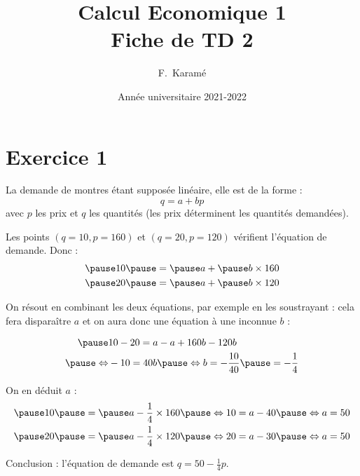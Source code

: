 \documentclass[9pt,professionalfonts,handout,hyperref]{beamer}
\title{Calcul Economique 1\\Fiche de TD 2}
\author{F.~Karamé}
\date{Année universitaire 2021-2022}
\begin{document}
\begin{frame}
  \titlepage
\end{frame}

\section{Exercice 1}

%
%

\begin{frame}

    La demande de montres étant supposée linéaire, elle est de la forme : $$q = a + bp $$ avec $p$ les prix et $q$ les quantités (les prix déterminent les quantités demandées).\newline

    \pause Les points $(q=10,p=160)$ et $(q=20,p=120)$ vérifient l'équation de demande. \pause Donc :
    \[
      \begin{aligned}
        \pause 10 \pause &= \pause a + \pause b\times 160  \\
        \pause 20 \pause &= \pause a + \pause b\times 120
      \end{aligned}
    \]

    \pause On résout en combinant les deux équations, par exemple en les soustrayant : \pause cela fera disparaître $a$ et on aura donc une équation à une inconnue $b$ :

    \[
      \begin{aligned}
        \pause &10-20 = a-a + 160b -120b \\
        \pause \Leftrightarrow&-10 = 40b \pause \Leftrightarrow b = -\frac{10}{40} \pause = -\frac{1}{4} \\
      \end{aligned}
    \]

    \pause On en déduit $a$ :
    \[
      \begin{aligned}
        \pause 10 \pause &= \pause a -\frac{1}{4}\times 160\pause \Leftrightarrow 10 = a - 40 \pause \Leftrightarrow  a = 50\\
        \pause 20 \pause &= \pause a -\frac{1}{4} \times 120\pause \Leftrightarrow 20 = a - 30 \pause \Leftrightarrow  a = 50
      \end{aligned}
    \]

    \pause Conclusion : l'équation de demande est $q = 50 -\frac{1}{4}p $.
  \end{frame}
\end{document}
